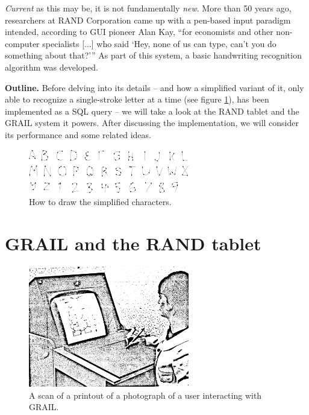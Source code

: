 \documentclass[sigconf]{acmart}
\begin{document}
\textit{Current} as this may be, it is not fundamentally \textit{new}. More than 50 years ago, researchers at RAND Corporation came up with a pen-based input paradigm intended, according to GUI pioneer Alan Kay, \enquote{for economists and other non-computer specialists [...] who said \enquote{Hey, none of us can type, can't you do something about that?}} \cite{kay} As part of this system, a basic handwriting recognition algorithm was developed. \cite{groner,schaedler}

\textbf{Outline.} Before delving into its details – and how a simplified variant of it, only able to recognize a single-stroke letter at a time (see figure \ref{chars}), has been implemented as a SQL query – we will take a look at the RAND tablet and the GRAIL system it powers. After discussing the implementation, we will consider its performance and some related ideas.

\begin{figure}[pb]
  \centering
  \includegraphics[width=7cm]{drawingguide}
  \caption{How to draw the simplified characters.}
  \label{chars}
\end{figure}

\section{GRAIL and the RAND tablet}

\begin{figure}[tpb]
  \centering
  \includegraphics[width=7cm]{grailconsole}
  \caption{A scan \cite{grail} of a printout of a photograph of a user interacting with GRAIL.}
  \label{grailconsole}
\end{figure}
\end{document}
